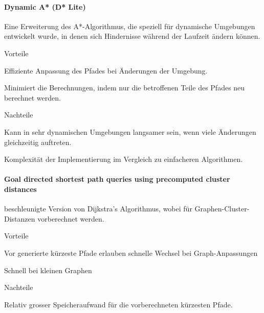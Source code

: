 \documentclass[../main.tex]{subfiles}
\begin{document}
\paragraph{Dynamic A* (D* Lite)}

Eine Erweiterung des A*-Algorithmus, die speziell für dynamische Umgebungen entwickelt wurde, in denen sich Hindernisse während der Laufzeit ändern können.

\begin{minipage}[t]{0.48\textwidth}
\begin{items}
  \item [Vorteile]
  \item Effiziente Anpassung des Pfades bei Änderungen der Umgebung.
  \item Minimiert die Berechnungen, indem nur die betroffenen Teile des Pfades neu berechnet werden.
\end{items}
\end{minipage}
\hfill
\begin{minipage}[t]{0.48\textwidth}
\begin{items}
  \item [Nachteile]
  \item Kann in sehr dynamischen Umgebungen langsamer sein, wenn viele Änderungen gleichzeitig auftreten.
  \item Komplexität der Implementierung im Vergleich zu einfacheren Algorithmen.
\end{items}
\end{minipage}


\paragraph{Goal directed shortest path queries using precomputed cluster distances}
beschleunigte Version von Dijkstra's Algorithmus, wobei für Graphen-Cluster-Distanzen vorberechnet werden.

\begin{minipage}[t]{0.48\textwidth}
\begin{items}
  \item [Vorteile]
  \item Vor generierte kürzeste Pfade erlauben schnelle Wechsel bei Graph-Anpassungen
  \item Schnell bei kleinen Graphen
\end{items}
\end{minipage}
\hfill
\begin{minipage}[t]{0.48\textwidth}
\begin{items}
  \item [Nachteile]
  \item Relativ grosser Speicheraufwand für die vorberechneten kürzesten Pfade.
\end{items}
\end{minipage}
\end{document}
